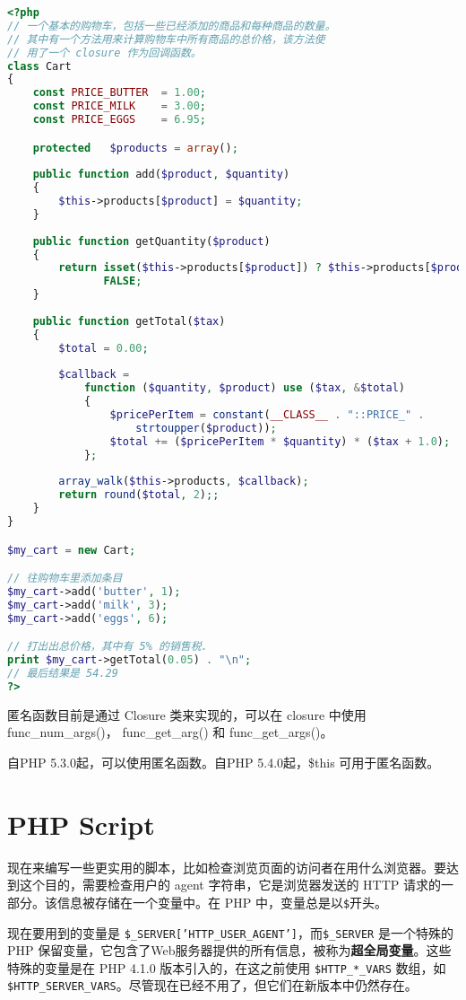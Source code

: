 \begin{lstlisting}[language=PHP]
<?php
// 一个基本的购物车，包括一些已经添加的商品和每种商品的数量。
// 其中有一个方法用来计算购物车中所有商品的总价格，该方法使
// 用了一个 closure 作为回调函数。
class Cart
{
    const PRICE_BUTTER  = 1.00;
    const PRICE_MILK    = 3.00;
    const PRICE_EGGS    = 6.95;

    protected   $products = array();
    
    public function add($product, $quantity)
    {
        $this->products[$product] = $quantity;
    }
    
    public function getQuantity($product)
    {
        return isset($this->products[$product]) ? $this->products[$product] :
               FALSE;
    }
    
    public function getTotal($tax)
    {
        $total = 0.00;
        
        $callback =
            function ($quantity, $product) use ($tax, &$total)
            {
                $pricePerItem = constant(__CLASS__ . "::PRICE_" .
                    strtoupper($product));
                $total += ($pricePerItem * $quantity) * ($tax + 1.0);
            };
        
        array_walk($this->products, $callback);
        return round($total, 2);;
    }
}

$my_cart = new Cart;

// 往购物车里添加条目
$my_cart->add('butter', 1);
$my_cart->add('milk', 3);
$my_cart->add('eggs', 6);

// 打出出总价格，其中有 5% 的销售税.
print $my_cart->getTotal(0.05) . "\n";
// 最后结果是 54.29
?>
\end{lstlisting}

匿名函数目前是通过 Closure 类来实现的，可以在 closure 中使用 func\_num\_args()， func\_get\_arg() 和 func\_get\_args()。

自PHP 5.3.0起，可以使用匿名函数。自PHP 5.4.0起，\$this 可用于匿名函数。


\chapter{PHP Script}


现在来编写一些更实用的脚本，比如检查浏览页面的访问者在用什么浏览器。要达到这个目的，需要检查用户的 agent 字符串，它是浏览器发送的 HTTP 请求的一部分。该信息被存储在一个变量中。在 PHP 中，变量总是以\texttt{\$}开头。

现在要用到的变量是 \texttt{\$\_SERVER['HTTP\_USER\_AGENT']}，而\texttt{\$\_SERVER} 是一个特殊的 PHP 保留变量，它包含了Web服务器提供的所有信息，被称为\textbf{超全局变量}。这些特殊的变量是在 PHP 4.1.0 版本引入的，在这之前使用 \texttt{\$HTTP\_*\_VARS} 数组，如 \texttt{\$HTTP\_SERVER\_VARS}。尽管现在已经不用了，但它们在新版本中仍然存在。

